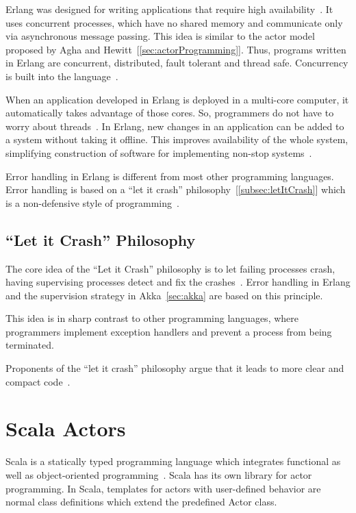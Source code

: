   Erlang was designed for writing applications that require high availability~\cite{armstrong}. It uses concurrent processes, which have no shared memory and communicate only via asynchronous message passing. This idea is similar to the actor model proposed by Agha and Hewitt~[\autoref{sec:actorProgramming}]. Thus, programs written in Erlang are concurrent, distributed, fault tolerant and thread safe. Concurrency is built into the language~\cite{Armstrong:2010:ERL:1810891.1810910}.

  When an application developed in Erlang is deployed in a multi-core computer, it automatically takes advantage of those cores. So, programmers do not have to worry about threads~\cite{Armstrong:2010:ERL:1810891.1810910}. In Erlang, new changes in an application can be added to a system without taking it offline. This improves availability of the whole system, simplifying construction of software for implementing non-stop systems~\cite{armstrong}.

  Error handling in Erlang is different from most other programming languages. Error handling is based on a “let it crash” philosophy~[\autoref{subsec:letItCrash}] which is a non-defensive style of programming~\cite{armstrong, Armstrong:2010:ERL:1810891.1810910}.

\subsection{“Let it Crash” Philosophy}
\label{subsec:letItCrash}
  The core idea of the “Let it Crash” philosophy is to let failing processes crash, having supervising processes detect and fix the crashes~\cite{Armstrong:2010:ERL:1810891.1810910}. Error handling in Erlang and the supervision strategy in Akka~\autoref{sec:akka} are based on this principle.

   This idea is in sharp contrast to other programming languages, where programmers implement exception handlers and prevent a process from being terminated.

  Proponents of the “let it crash” philosophy argue that it leads to more clear and compact code~\cite{Armstrong:2010:ERL:1810891.1810910}.

\section{Scala Actors}
\label{sec:scala}
Scala is a statically typed programming language which integrates functional as well as object-oriented programming~\cite{Odersky}. Scala has its own library for actor programming. In Scala, templates for actors with user-defined behavior are normal class definitions which extend the predefined Actor class.

